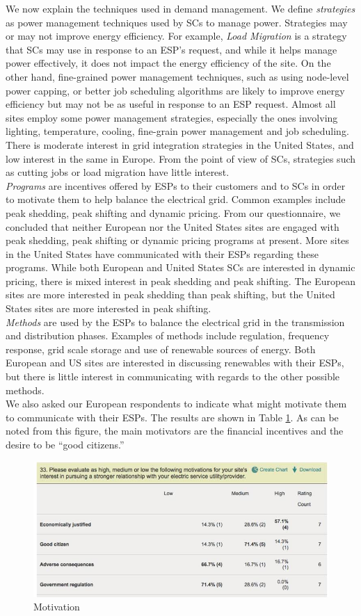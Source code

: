 We now explain the techniques used in demand management. We define \emph{strategies} as power management techniques used by SCs to manage power. Strategies may or may not improve energy efficiency. For example, \emph{Load Migration} is a strategy that SCs may use in response to an ESP's request, and while it helps manage power effectively, it does not impact the energy efficiency of the site. On the other hand, fine-grained power management techniques, such as using node-level power capping, or better job scheduling algorithms are likely to improve energy efficiency but may not be as useful in response to an ESP request. Almost all sites employ some power management strategies, especially the ones involving lighting, temperature, cooling, fine-grain power management and job scheduling. There is moderate interest in grid integration strategies in the United States, and low interest in the same in Europe. From the point of view of SCs, strategies such as cutting jobs or load migration have little interest. \\

\emph{Programs} are incentives offered by ESPs to their customers and to SCs in order to motivate them to help balance the electrical grid. Common examples include peak shedding, peak shifting and dynamic pricing. From our questionnaire, we concluded that neither European nor the United States sites are engaged with peak shedding, peak shifting or dynamic pricing programs at present. More sites in the United States have communicated with their ESPs regarding these programs. While both European and United States SCs are interested in dynamic pricing, there is mixed interest in peak shedding and peak shifting. The European sites are more interested in peak shedding than peak shifting, but the United States sites are more interested in peak shifting. \\

\emph{Methods} are used by the ESPs to balance the electrical grid in the transmission and distribution phases. Examples of methods include regulation, frequency response, grid scale storage and use of renewable sources of energy. Both European and US sites are interested in discussing renewables with their ESPs, but there is little interest in communicating with regards to the other possible methods. \\

We also asked our European respondents to indicate what might motivate them to communicate with their ESPs. The results are shown in Table \ref{fig:table2}. As can be noted from this figure, the main motivators are the financial incentives and the desire to be ``good citizens.''

\begin{figure}
\begin{center}
\includegraphics[scale=0.5]{figs/Table2.jpg}
\caption{Motivation}
\label{fig:table2}
\end{center}
\end{figure}


